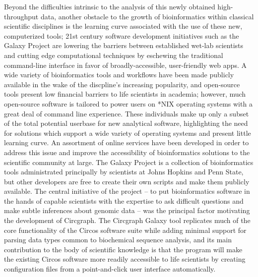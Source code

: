 \documentclass[twocolumn]{article}
\begin{document}
Beyond the difficulties intrinsic to the analysis of this newly obtained high-throughput data, another obstacle to the growth of bioinformatics within classical scientific disciplines is the learning curve associated with the use of these new, computerized tools; 21st century software development initiatives such as the Galaxy Project are lowering the barriers between established wet-lab scientists and cutting edge computational techniques by eschewing the traditional command-line interface in favor of broadly-accessible, user-friendly web apps.\cite{galaxypaper} A wide variety of bioinformatics tools and workflows have been made publicly available in the wake of the discpline's increasing popularity, and open-source tools present low financial barriers to life scientists in academia; however, much open-source software is tailored to power users on *NIX operating systems with a great deal of command line experience. These individuals make up only a subset of the total potential userbase for new analytical software, highlighting the need for solutions which support a wide variety of operating systems and present little learning curve. An assortment of online services have been developed in order to address this issue and improve the accessibility of bioinformatics solutions to the scientific community at large. The Galaxy Project is a collection of bioinformatics tools administrated principally by scientists at Johns Hopkins and Penn State, but other developers are free to create their own scripts and make them publicly available.\cite{galaxypaper} The central initiative of the project -- to put bioinformatics software in the hands of capable scientists with the expertise to ask difficult questions and make subtle inferences about genomic data -- was the principal factor motivating the development of Circgraph.\cite{galaxypaper} The Circgraph Galaxy tool replicates much of the core functionality of the Circos software suite while adding minimal support for parsing data types common to biochemical sequence analysis, and its main contribution to the body of scientific knowledge is that the program will make the existing Circos software more readily accessible to life scientists by creating configuration files from a point-and-click user interface automatically.  
\end{document}
